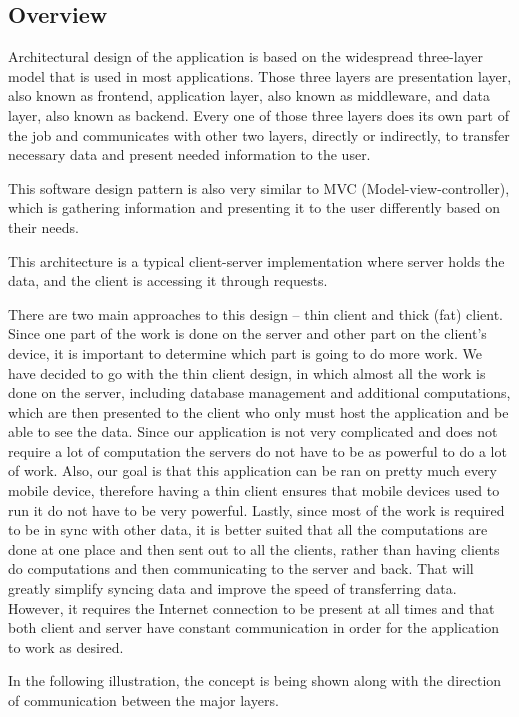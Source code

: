 
\subsection{Overview}
\label{sec:overview}
\hspace{\parindent}Architectural design of the application is based on the widespread three-layer model that is used in most applications. Those three layers are presentation layer, also known as frontend, application layer, also known as middleware, and data layer, also known as backend. Every one of those three layers does its own part of the job and communicates with other two layers, directly or indirectly, to transfer necessary data and present needed information to the user. 

This software design pattern is also very similar to MVC (Model-view-controller), which is gathering information and presenting it to the user differently based on their needs. 

This architecture is a typical client-server implementation where server holds the data, and the client is accessing it through requests. 

There are two main approaches to this design – thin client and thick (fat) client. Since one part of the work is done on the server and other part on the client’s device, it is important to determine which part is going to do more work. We have decided to go with the thin client design, in which almost all the work is done on the server, including database management and additional computations, which are then presented to the client who only must host the application and be able to see the data. Since our application is not very complicated and does not require a lot of computation the servers do not have to be as powerful to do a lot of work. Also, our goal is that this application can be ran on pretty much every mobile device, therefore having a thin client ensures that mobile devices used to run it do not have to be very powerful. Lastly, since most of the work is required to be in sync with other data, it is better suited that all the computations are done at one place and then sent out to all the clients, rather than having clients do computations and then communicating to the server and back. That will greatly simplify syncing data and improve the speed of transferring data. However, it requires the Internet connection to be present at all times and that both client and server have constant communication in order for the application to work as desired.  

In the following illustration, the concept is being shown along with the direction of communication between the major layers.\newline 

